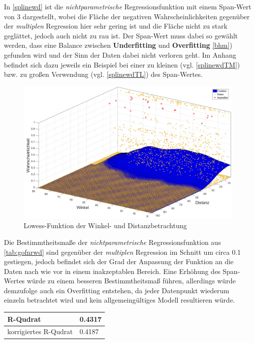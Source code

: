 In \vref{splinewd} ist die \textit{nichtparametrische} Regressionsfunktion mit einem Span-Wert von \textsf{3} dargestellt, wobei die Fläche der negativen Wahrscheinlichkeiten gegenüber der \textit{multiplen} Regression hier sehr gering ist und die Fläche nicht zu stark geglättet, jedoch auch nicht zu rau ist. Der Span-Wert muss dabei so gewählt werden, dass eine Balance zwischen \textbf{Underfitting} und \textbf{Overfitting} \vref{bhm}) gefunden wird und der Sinn der Daten dabei nicht verloren geht. Im Anhang befindet sich dazu jeweils ein Beispiel bei einer zu kleinen (vgl. \vref{splinewdTM}) bzw. zu großen Verwendung (vgl. \vref{splinewdTL}) des Span-Wertes.

\begin{figure}[H]
\centering
\includegraphics[scale=0.34]{se-wa-jpg/splinewd}
\caption{Lowess-Funktion der Winkel- und Distanzbetrachtung}
\label{splinewd}
\end{figure}

\enlargethispage{2\baselineskip} Die Bestimmtheitsmaße der \textit{nichtparametrische} Regressionsfunktion aus \vref{tab:gofnrwd} sind gegenüber der \textit{multiplen} Regression im Schnitt um circa \textsf{0.1} gestiegen, jedoch befindet sich der Grad der Anpassung der Funktion an die Daten nach wie vor in einem inakzeptablen Bereich. Eine Erhöhung des Span-Wertes würde zu einem besseren Bestimmtheitsmaß führen, allerdings würde demzufolge auch ein Overfitting entstehen, da jeder Datenpunkt wiederum einzeln betrachtet wird und kein allgemeingültiges Modell resultieren würde.

\tablehead{}
\tabletail{}
\tablelasttail{}
\begin{center}%
\begin{supertabular}{ | P{6cm} | P{3cm}  |}
\textsf{R-Qudrat} 	& 0.4317	\\
\hline
\textsf{korrigiertes R-Qudrat} 	&  0.4187	\\
\hline
\end{supertabular}
\end{center}

